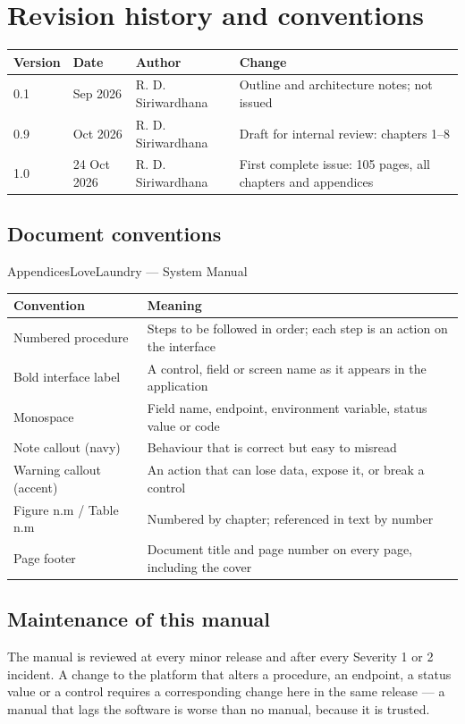 \documentclass[11pt,a4paper,oneside]{book}
\begin{document}
\section*{Revision history and conventions}
\begin{center}\small
\begin{tabularx}{\linewidth}{|X|X|X|X|}
\hline
\rowcolor{lightgrey}
\textbf{Version} & \textbf{Date} & \textbf{Author} & \textbf{Change} \\ \hline
0.1 & Sep 2026 & R. D. Siriwardhana & Outline and architecture notes; not issued \\ \hline
0.9 & Oct 2026 & R. D. Siriwardhana & Draft for internal review: chapters 1–8 \\ \hline
1.0 & 24 Oct 2026 & R. D. Siriwardhana & First complete issue: 105 pages, all chapters and appendices \\ \hline
\end{tabularx}
\end{center}
\subsection*{Document conventions}
AppendicesLoveLaundry — System Manual

\begin{center}\small
\begin{tabularx}{\linewidth}{|X|X|}
\hline
\rowcolor{lightgrey}
\textbf{Convention} & \textbf{Meaning} \\ \hline
Numbered procedure & Steps to be followed in order; each step is an action on the interface \\ \hline
Bold interface label & A control, field or screen name as it appears in the application \\ \hline
Monospace & Field name, endpoint, environment variable, status value or code \\ \hline
Note callout (navy) & Behaviour that is correct but easy to misread \\ \hline
Warning callout (accent) & An action that can lose data, expose it, or break a control \\ \hline
Figure n.m / Table n.m & Numbered by chapter; referenced in text by number \\ \hline
Page footer & Document title and page number on every page, including the cover \\ \hline
\end{tabularx}
\end{center}
\subsection*{Maintenance of this manual}
The manual is reviewed at every minor release and after every Severity 1 or 2 incident. A change to the platform that alters a procedure, an endpoint, a status value or a control requires a corresponding change here in the same release — a manual that lags the software is worse than no manual, because it is trusted.
\end{document}
